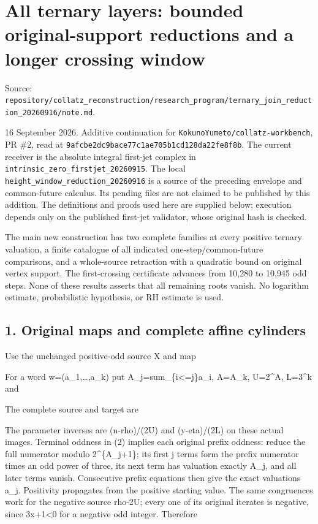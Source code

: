 \chapter{All ternary layers: bounded original-support reductions and a
longer crossing window}
{\small\sffamily Source: \nolinkurl{repository/collatz_reconstruction/research_program/ternary_join_reduction_20260916/note.md}.\par}


16 September 2026. Additive continuation for
\nolinkurl{KokunoYumeto/collatz-workbench}, PR \#2, read at
\nolinkurl{9afcbe2dc9bace77c1ae705b1cd128da22fe8f8b}. The current
receiver is the absolute integral first-jet complex in
\nolinkurl{intrinsic_zero_firstjet_20260915}. The local
\nolinkurl{height_window_reduction_20260916} is a source of the
preceding envelope and common-future calculus. Its pending files are not
claimed to be published by this addition. The definitions and proofs
used here are supplied below; execution depends only on the published
first-jet validator, whose original hash is checked.

The main new construction has two complete families at every positive
ternary valuation, a finite catalogue of all indicated
one-step/common-future comparisons, and a whole-source retraction with a
quadratic bound on original vertex support. The first-crossing
certificate advances from 10,280 to 10,945 odd steps. None of these
results asserts that all remaining roots vanish. No logarithm estimate,
probabilistic hypothesis, or RH estimate is used.

\section{1. Original maps and complete affine cylinders}

Use the unchanged positive-odd source X and map


For a word w=(a\_1,\ldots,a\_k) put A\_j=sum\_\{i\textless=j\}a\_i,
A=A\_k, U=2\^{}A, L=3\^{}k and


The complete source and target are


The parameter inverses are (n-rho)/(2U) and (y-eta)/(2L) on these actual
images. Terminal oddness in (2) implies each original prefix oddness:
reduce the full numerator modulo 2\^{}\{A\_j+1\}; its first j terms form
the prefix numerator times an odd power of three, its next term has
valuation exactly A\_j, and all later terms vanish. Consecutive prefix
equations then give the exact valuations a\_j. Positivity propagates
from the positive starting value. The same congruences work for the
negative source rho-2U; every one of its original iterates is negative,
since 3x+1\textless0 for a negative odd integer. Therefore

